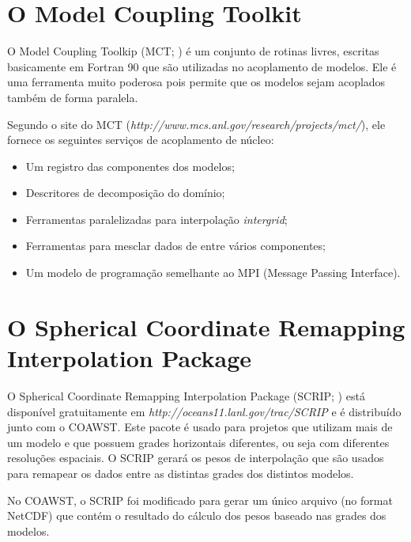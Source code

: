 \section{O Model Coupling Toolkit}
\bigskip

\noindent O Model Coupling Toolkip (MCT; \cite{Larson2005,Jacob2005,Warner2008}) é um conjunto de rotinas livres, escritas basicamente em Fortran 90 que são utilizadas no acoplamento de modelos. Ele é uma ferramenta muito poderosa pois permite que os modelos sejam acoplados também de forma paralela.
\bigskip

\noindent Segundo o site do MCT (\textcolor{bleu_cite}{\textit{http://www.mcs.anl.gov/research/projects/mct/}}), ele fornece os seguintes serviços de acoplamento de núcleo:
\bigskip

\begin{itemize}
\item Um registro das componentes dos modelos;
\item Descritores de decomposição do domínio;
\item Ferramentas paralelizadas para interpolação \textit{intergrid};
\item Ferramentas para mesclar dados de entre vários componentes;
\item Um modelo de programação semelhante ao MPI (Message Passing Interface).
\end{itemize}
\bigskip

\section{ O Spherical Coordinate Remapping Interpolation Package}\label{scripsecao}
\bigskip

\noindent O  Spherical Coordinate Remapping Interpolation Package (SCRIP; \cite{Jones1999,Jones1998}) está disponível gratuitamente em \textcolor{bleu_cite}{\textit{http://oceans11.lanl.gov/trac/SCRIP}} e é distribuído junto com o COAWST. Este pacote é usado para projetos que utilizam mais de um modelo e que possuem grades horizontais diferentes, ou seja com diferentes resoluções espaciais. O SCRIP gerará os pesos de interpolação que são usados para remapear os dados entre as distintas grades dos distintos modelos.
\bigskip

\noindent No COAWST, o SCRIP foi modificado para gerar um único arquivo (no format NetCDF) que contém o resultado do cálculo dos pesos baseado nas grades dos modelos.

